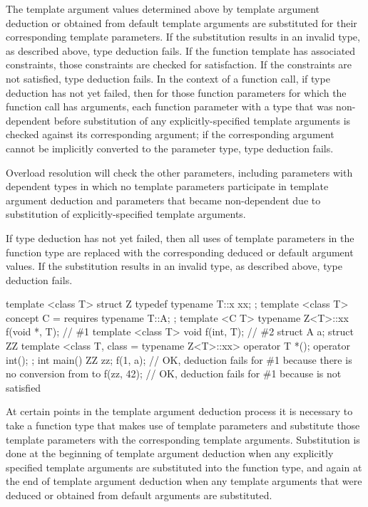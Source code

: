 The template argument values determined above by template argument deduction
or obtained from default template arguments
are substituted for their corresponding template parameters.
If the substitution results in an
invalid type, as described above, type deduction fails.
If the function template has associated constraints,
those constraints are checked for satisfaction.
If the constraints are not satisfied, type deduction fails.
In the context of a function call, if type deduction has not yet failed, then
for those function parameters for which the function call has arguments,
each function parameter with a type that was non-dependent
before substitution of any explicitly-specified template arguments
is checked against its corresponding argument;
if the corresponding argument cannot be implicitly converted
to the parameter type, type deduction fails.
\begin{note}
Overload resolution will check the other parameters, including
parameters with dependent types in which
no template parameters participate in template argument deduction and
parameters that became non-dependent due to substitution of
explicitly-specified template arguments.
\end{note}
If type deduction has not yet failed, then
all uses of template parameters in the function type are
replaced with the corresponding deduced or default argument values.
If the substitution results in an invalid type, as described above,
type deduction fails.
\begin{example}
\begin{codeblock}
template <class T> struct Z {
  typedef typename T::x xx;
};
template <class T> concept C = requires { typename T::A; };
template <C T> typename Z<T>::xx f(void *, T);          // \#1
template <class T> void f(int, T);                      // \#2
struct A {} a;
struct ZZ {
  template <class T, class = typename Z<T>::xx> operator T *();
  operator int();
};
int main() {
  ZZ zz;
  f(1, a);              // OK, deduction fails for \#1 because there is no conversion from  to 
  f(zz, 42);            // OK, deduction fails for \#1 because  is not satisfied
}
\end{codeblock}
\end{example}

\pnum
At certain points in the template argument deduction process it is necessary
to take a function type that makes use of template parameters and substitute those
template parameters with the corresponding template arguments. Substitution is done at
the beginning of template argument deduction when any explicitly specified
template arguments are substituted into the function type, and again at the end
of template argument deduction when any template arguments that were deduced or
obtained from default arguments are substituted.


